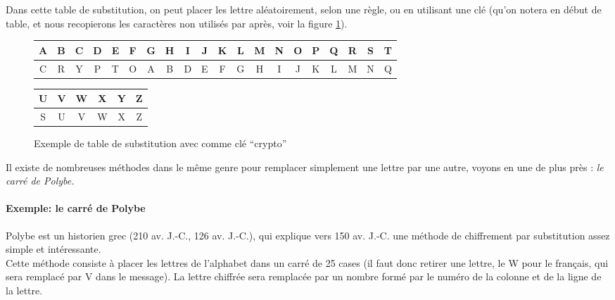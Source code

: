 Dans cette table de substitution, on peut placer les lettre
aléatoirement, selon une règle, ou en utilisant une clé (qu'on notera
en début de table, et nous recopierons les caractères non utilisés par
après, voir la figure \ref{fig:SubstitutionCle}).

\begin{figure}[h]
  \begin{center}
    \begin{tabular}{|c|c|c|c|c|c|c|c|c|c|c|c|c|c|c|c|c|c|c|c}
      \hline
      A & B & C & D & E & F & G & H & I & J & K & L & M & N & O & P &
      Q & R & S & T \\
      \hline
      C & R & Y & P & T & O & A & B & D & E & F & G & H & I & J & K &
      L & M & N  & Q  \\
      \hline
    \end{tabular}
  \end{center}
  \begin{flushright}
    \begin{tabular}{c|c|c|c|c|c|}
      \hline
      U & V & W & X & Y & Z  \\
      \hline
      S & U & V & W & X & Z \\
      \hline
    \end{tabular}
  \end{flushright}
  \caption{Exemple de table de substitution avec comme clé ``crypto''}
  \label{fig:SubstitutionCle}
\end{figure}

Il existe de nombreuses méthodes dans le même genre pour remplacer
simplement une lettre par une autre, voyons en une de plus près :
\emph{le carré de Polybe.}\\

\paragraph{Exemple: le carré de Polybe\label{syst:CarrePolybe}}
Polybe est un historien grec (210 av. J.-C., 126 av. J.-C.), qui
explique vers 150 av. J.-C. une méthode de chiffrement par
substitution assez simple et intéressante.\\

Cette méthode consiste à placer les lettres de l'alphabet dans un
carré de 25 cases (il faut donc retirer une lettre, le W pour le
français, qui sera remplacé par V dans le message). La lettre chiffrée
sera remplacée par un nombre formé par le numéro de la colonne et de
la ligne de la lettre.\\

